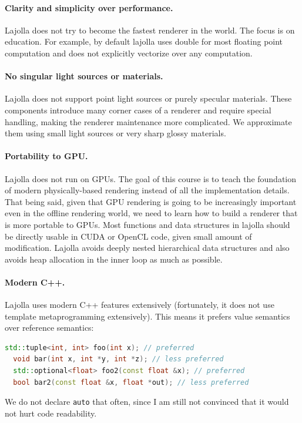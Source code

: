 \documentclass{article}
\begin{document}
\paragraph{Clarity and simplicity over performance.} Lajolla does not try to become the fastest renderer in the world. The focus is on education. For example, by default lajolla uses double for most floating point computation and does not explicitly vectorize over any computation.

\paragraph{No singular light sources or materials.} Lajolla does not support point light sources or purely specular materials. These components introduce many corner cases of a renderer and require special handling, making the renderer maintenance more complicated. We approximate them using small light sources or very sharp glossy materials.

\paragraph{Portability to GPU.} Lajolla does not run on GPUs. The goal of this course is to teach the foundation of modern physically-based rendering instead of all the implementation details. That being said, given that GPU rendering is going to be increasingly important even in the offline rendering world, we need to learn how to build a renderer that is more portable to GPUs. Most functions and data structures in lajolla should be directly usable in CUDA or OpenCL code, given small amount of modification. Lajolla avoids deeply nested hierarchical data structures and also avoids heap allocation in the inner loop as much as possible.

\paragraph{Modern C++.} Lajolla uses modern C++ features extensively (fortunately, it does not use template metaprogramming extensively). This means it prefers value semantics over reference semantics:
\begin{lstlisting}[language=C++]
  std::tuple<int, int> foo(int x); // preferred
  void bar(int x, int *y, int *z); // less preferred
  std::optional<float> foo2(const float &x); // preferred
  bool bar2(const float &x, float *out); // less preferred
\end{lstlisting}
We do not declare \lstinline{auto} that often, since I am still not convinced that it would not hurt code readability.
\end{document}
